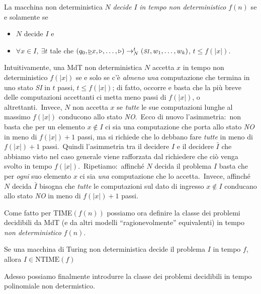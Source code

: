 \begin{definition}
    La macchina non deterministica $N$ \textit{decide} $I$ \textit{in tempo non deterministico} $f(n)$ se e solamente se
    \begin{itemize}
        \itemsep 0px
        \item $N$ decide $I$ e
        \item $\forall x \in I,\ \exists t$ tale che $(q_0, \underline{\triangleright}x,\triangleright, \dots, \triangleright ) \rightarrow^t_N (\mbox{\textit{\footnotesize SI}}, w_1, \dots,w_k)$, $t \leq f(|x|)$.
    \end{itemize}
\end{definition}

\noindent Intuitivamente, una MdT non deterministica $N$ accetta $x$ in tempo non deterministico $f(|x|)$ se e solo se c'è \textit{almeno una} computazione che termina in uno stato \textit{\footnotesize SI} in $t$ passi, $t \leq f(|x|)$; di fatto, occorre e basta che la più breve delle computazioni accettanti ci metta meno passi di $f(|x|)$, o altrettanti.\
Invece, $N$ non accetta $x$ se \textit{tutte} le sue computazioni lunghe al massimo $f(|x|)$ conducono allo stato \textit{\footnotesize NO}.\
Ecco di nuovo l'asimmetria:\ non basta che per un elemento $x \notin I$ ci sia una computazione che porta allo stato \textit{\footnotesize NO} in meno di $f(|x|) + 1$ passi, ma si richiede che lo debbano fare \textit{tutte} in meno di $f(|x|) + 1$ passi.\
Quindi l'asimmetria tra il decidere $I$ e il decidere $\bar{I}$ che abbiamo visto nel caso generale viene rafforzata dal richiedere che ciò venga svolto in tempo $f(|x|)$.\
Ripetiamo:\ affinché $N$ decida il problema $I$ basta che per \textit{ogni} suo elemento $x$ ci sia \textit{una} computazione che lo accetta.\
Invece, affinché $N$ decida $\bar{I}$ bisogna che \textit{tutte} le computazioni sul dato di ingresso $x \notin I$ conducano allo stato \textit{\footnotesize NO} in meno di $f(|x|) + 1$ passi.\

Come fatto per TIME$(f(n))$ possiamo ora definire la classe dei problemi decidibili da MdT (e da altri modelli ``ragionevolmente'' equivalenti) in tempo \textit{non deterministico} $f(n)$.

\begin{definition}
    Se una macchina di Turing non deterministica decide il problema $I$ in tempo $f$, allora $I \in \mathrm{NTIME}(f)$
\end{definition}

\noindent Adesso possiamo finalmente introdurre la classe dei problemi decidibili in tempo polinomiale non determistico.

